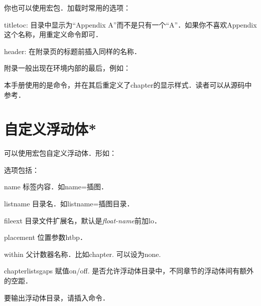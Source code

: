 你也可以使用宏包．加载时常用的选项：
\begin{para}
\item[titletoc:] 目录中显示为``Appendix A''而不是只有一个``A''．如果你不喜欢Appendix这个名称，用重定义命令即可．
\item[header:] 在附录页的标题前插入同样的名称．
\end{para}

附录一般出现在环境内部的最后，例如：
\begin{latex}
\end{latex}

本手册使用的是命令，并在其后重定义了chapter的显示样式．读者可以从源码中参考．

\section{自定义浮动体*}
可以使用宏包自定义浮动体．形如：
\begin{latex}
\end{latex}

选项包括：
\begin{para}
\item[name] 标签内容．如name=插图．
\item[listname] 目录名．如listname=插图目录．
\item[fileext] 目录文件扩展名，默认是\textit{float-name}前加lo．
\item[placement] 位置参数htbp．
\item[within] 父计数器名称．比如chapter. 可以设为none.
\item[chapterlistsgaps] 赋值on/off. 是否允许浮动体目录中，不同章节的浮动体间有额外的空距．
\end{para}

要输出浮动体目录，请插入命令．

